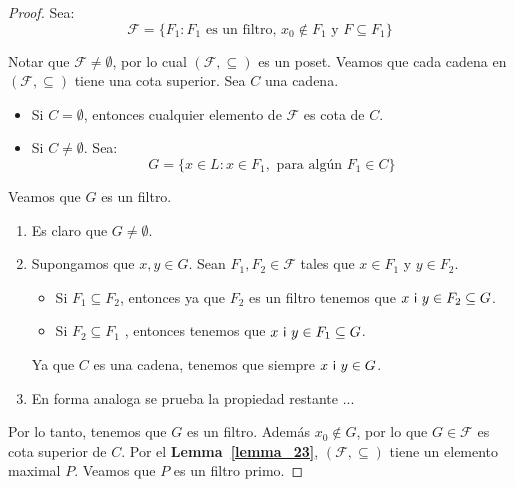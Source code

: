   \begin{proof}
    \PN Sea:
    \[
      \mathcal{F} = \{F_{1}: F_{1} \text{ es un filtro, } x_{0} \notin F_{1} \text{ y } F \subseteq F_{1}\}
    \]

    \PN Notar que $\mathcal{F} \neq \emptyset$, por lo cual $(\mathcal{F}, \subseteq)$ es un poset.
    \PN Veamos que cada cadena en $(\mathcal{F}, \subseteq)$ tiene una cota superior. Sea $C$ una cadena.
    \begin{itemize}
      \item Si $C = \emptyset$, entonces cualquier elemento de $\mathcal{F}$ es cota de $C$.
      \item Si $C \neq \emptyset$. Sea:
        \[
          G = \{x \in L: x \in F_{1}, \text{ para algún } F_{1} \in C\}
        \]
    \end{itemize}

    \PN Veamos que $G$ es un filtro.
    \begin{enumerate}
      \item Es claro que $G \neq \emptyset$.
      \item Supongamos que $ x,y\in G$. Sean $F_{1},F_{2}\in \mathcal{F}$ tales que $x\in F_{1}$ y $y\in F_{2}$.
      \begin{itemize}
        \item Si $F_{1}\subseteq F_{2}$, entonces ya que $F_{2}$ es un filtro tenemos que $x \ \mathsf{i} \ y\in F_{2}\subseteq G$.
        \item Si $F_{2}\subseteq F_{1}$ , entonces tenemos que $x \ \mathsf{i} \ y \in F_{1} \subseteq G$.
      \end{itemize}
      \PN Ya que $C$ es una cadena, tenemos que siempre $x \ \IN \ y \in G$.

      \item En forma analoga se prueba la propiedad restante ...
    \end{enumerate}

    \PN Por lo tanto, tenemos que $G$ es un filtro. Además $x_{0} \notin G$, por lo que $G \in \mathcal{F}$ es cota
    superior de $C$. Por el \textbf{Lemma~\ref{lemma_23}}, $(\mathcal{F}, \subseteq)$ tiene un elemento maximal $P$.
    Veamos que $P$ es un filtro primo.


\end{proof}
